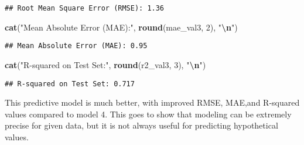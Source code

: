 \documentclass[
]{article}
\newenvironment{Shaded}{\begin{snugshade}}{\end{snugshade}}
\newcommand{\DecValTok}[1]{\textcolor[rgb]{0.00,0.00,0.81}{#1}}
\newcommand{\FunctionTok}[1]{\textcolor[rgb]{0.13,0.29,0.53}{\textbf{#1}}}
\newcommand{\NormalTok}[1]{#1}
\newcommand{\SpecialCharTok}[1]{\textcolor[rgb]{0.81,0.36,0.00}{\textbf{#1}}}
\newcommand{\StringTok}[1]{\textcolor[rgb]{0.31,0.60,0.02}{#1}}
\begin{document}
\begin{verbatim}
## Root Mean Square Error (RMSE): 1.36
\end{verbatim}

\begin{Shaded}
\begin{Highlighting}[]
\FunctionTok{cat}\NormalTok{(}\StringTok{"Mean Absolute Error (MAE):"}\NormalTok{, }\FunctionTok{round}\NormalTok{(mae\_val3, }\DecValTok{2}\NormalTok{), }\StringTok{"}\SpecialCharTok{\textbackslash{}n}\StringTok{"}\NormalTok{)}
\end{Highlighting}
\end{Shaded}

\begin{verbatim}
## Mean Absolute Error (MAE): 0.95
\end{verbatim}

\begin{Shaded}
\begin{Highlighting}[]
\FunctionTok{cat}\NormalTok{(}\StringTok{"R{-}squared on Test Set:"}\NormalTok{, }\FunctionTok{round}\NormalTok{(r2\_val3, }\DecValTok{3}\NormalTok{), }\StringTok{"}\SpecialCharTok{\textbackslash{}n}\StringTok{"}\NormalTok{)}
\end{Highlighting}
\end{Shaded}

\begin{verbatim}
## R-squared on Test Set: 0.717
\end{verbatim}

This predictive model is much better, with improved RMSE, MAE,and
R-squared values compared to model 4. This goes to show that modeling
can be extremely precise for given data, but it is not always useful for
predicting hypothetical values.
\end{document}
